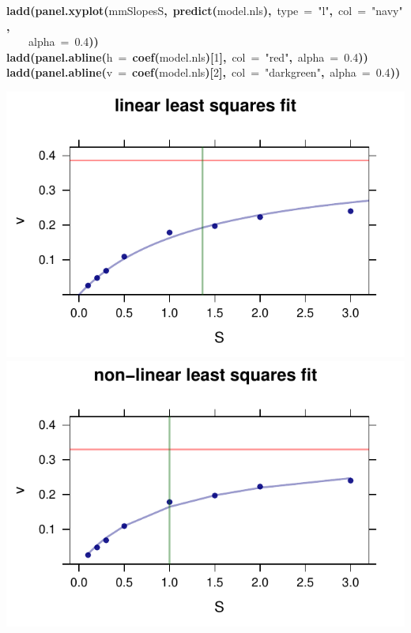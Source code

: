 \documentclass{article}
\makeatletter
\newcommand{\hlnumber}[1]{\textcolor[rgb]{0,0,0}{#1}}%
\newcommand{\hlfunctioncall}[1]{\textcolor[rgb]{0.501960784313725,0,0.329411764705882}{\textbf{#1}}}%
\newcommand{\hlstring}[1]{\textcolor[rgb]{0.6,0.6,1}{#1}}%
\newcommand{\hlkeyword}[1]{\textcolor[rgb]{0,0,0}{\textbf{#1}}}%
\newcommand{\hlargument}[1]{\textcolor[rgb]{0.690196078431373,0.250980392156863,0.0196078431372549}{#1}}%
\newcommand{\hlsymbol}[1]{\textcolor[rgb]{0,0,0}{#1}}%
\newcommand{\hlstd}[1]{\textcolor[rgb]{0,0,0}{#1}}%
\newenvironment{kframe}{%
 \def\FrameCommand##1{\hskip\@totalleftmargin \hskip-\fboxsep
 \colorbox{shadecolor}{##1}\hskip-\fboxsep
     \hskip-\linewidth \hskip-\@totalleftmargin \hskip\columnwidth}%
 \MakeFramed {\advance\hsize-\width
   \@totalleftmargin\z@ \linewidth\hsize
   \@setminipage}}%
 {\par\unskip\endMakeFramed}
\newenvironment{knitrout}{}{} %
\makeatother
\begin{document}
\begin{knitrout}
\begin{kframe}
\begin{flushleft}
\hlstd{}\hlfunctioncall{ladd}\hlkeyword{(}\hlfunctioncall{panel.xyplot}\hlkeyword{(}\hlsymbol{mmSlopes}\hlkeyword{\usebox{\hlnormalsizeboxdollar}}\hlsymbol{S}\hlkeyword{,}{\ }\hlfunctioncall{predict}\hlkeyword{(}\hlsymbol{model.nls}\hlkeyword{)}\hlkeyword{,}{\ }\hlargument{type}{\ }\hlargument{=}{\ }\hlstring{"{}l"{}}\hlkeyword{,}{\ }\hlargument{col}{\ }\hlargument{=}{\ }\hlstring{"{}navy"{}}\hlkeyword{,}\hspace*{\fill}\\
\hlstd{}{\ }{\ }{\ }{\ }\hlargument{alpha}{\ }\hlargument{=}{\ }\hlnumber{0.4}\hlkeyword{)}\hlkeyword{)}\hspace*{\fill}\\
\hlstd{}\hlfunctioncall{ladd}\hlkeyword{(}\hlfunctioncall{panel.abline}\hlkeyword{(}\hlargument{h}{\ }\hlargument{=}{\ }\hlfunctioncall{coef}\hlkeyword{(}\hlsymbol{model.nls}\hlkeyword{)}\hlkeyword{[}\hlnumber{1}\hlkeyword{]}\hlkeyword{,}{\ }\hlargument{col}{\ }\hlargument{=}{\ }\hlstring{"{}red"{}}\hlkeyword{,}{\ }\hlargument{alpha}{\ }\hlargument{=}{\ }\hlnumber{0.4}\hlkeyword{)}\hlkeyword{)}\hspace*{\fill}\\
\hlstd{}\hlfunctioncall{ladd}\hlkeyword{(}\hlfunctioncall{panel.abline}\hlkeyword{(}\hlargument{v}{\ }\hlargument{=}{\ }\hlfunctioncall{coef}\hlkeyword{(}\hlsymbol{model.nls}\hlkeyword{)}\hlkeyword{[}\hlnumber{2}\hlkeyword{]}\hlkeyword{,}{\ }\hlargument{col}{\ }\hlargument{=}{\ }\hlstring{"{}darkgreen"{}}\hlkeyword{,}{\ }\hlargument{alpha}{\ }\hlargument{=}{\ }\hlnumber{0.4}\hlkeyword{)}\hlkeyword{)}\mbox{}
\normalfont
\end{flushleft}
\end{kframe}

{\centering \includegraphics[width=.47\textwidth]{figures/modeling-unnamed-chunk-31} \includegraphics[width=.47\textwidth]{figures/modeling-unnamed-chunk-32} 

}


\end{knitrout}
\end{document}
